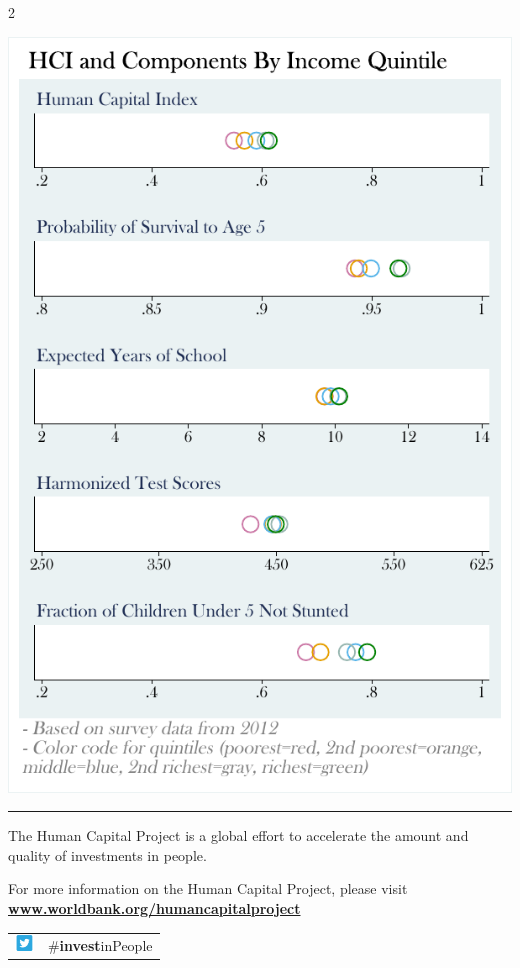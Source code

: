 \documentclass[8pt,]{article}
\begin{document}
\begin {multicols}{2}
\begin{flushright}\includegraphics[width=1\linewidth]{charts/ses_TJK} \end{flushright}

\noindent

\rule{9cm}{0.4pt}

The Human Capital Project is a global effort to accelerate the amount
and quality of investments in people. ~

For more information on the Human Capital Project, please visit
\textbf{\href{https://www.worldbank.org/humancapitalproject}{www.worldbank.org/humancapitalproject}}

\begin{table}[H]
\begin{tabular}{ll}
\includegraphics[width=0.5cm]{static/twitter.png} & \#\textbf{invest}inPeople   \\
\end{tabular}
\end{table}

\end {multicols}
\end{document}
